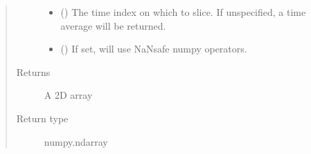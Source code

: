 \documentclass[letterpaper,10pt,english]{sphinxmanual}
\begin{document}
\begin{fulllineitems}
\begin{quote}
\begin{description}
\begin{itemize}
\item {} 
 (\sphinxstyleliteralemphasis{\sphinxupquote{, }}) \textendash{} The time index on which to slice. If unspecified, a time average will be returned.

\item {} 
 (\sphinxstyleliteralemphasis{\sphinxupquote{, }}) \textendash{} If set, will use NaN\sphinxhyphen{}safe numpy operators.

\end{itemize}

\item[{Returns}] \leavevmode
A 2\sphinxhyphen{}D array

\item[{Return type}] \leavevmode
numpy.ndarray

\end{description}\end{quote}

\end{fulllineitems}

\end{document}
